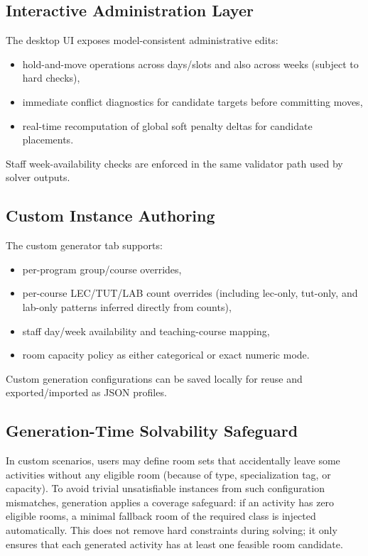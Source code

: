 \subsection{Interactive Administration Layer}
The desktop UI exposes model-consistent administrative edits:
\begin{itemize}[leftmargin=*]
  \item hold-and-move operations across days/slots and also across weeks (subject to hard checks),
  \item immediate conflict diagnostics for candidate targets before committing moves,
  \item real-time recomputation of global soft penalty deltas for candidate placements.
\end{itemize}
Staff week-availability checks are enforced in the same validator path used by solver outputs.

\subsection{Custom Instance Authoring}
The custom generator tab supports:
\begin{itemize}[leftmargin=*]
  \item per-program group/course overrides,
  \item per-course LEC/TUT/LAB count overrides (including lec-only, tut-only, and lab-only patterns inferred directly from counts),
  \item staff day/week availability and teaching-course mapping,
  \item room capacity policy as either categorical or exact numeric mode.
\end{itemize}
Custom generation configurations can be saved locally for reuse and exported/imported as JSON profiles.

\subsection{Generation-Time Solvability Safeguard}
In custom scenarios, users may define room sets that accidentally leave some activities without any eligible room
(because of type, specialization tag, or capacity).
To avoid trivial unsatisfiable instances from such configuration mismatches, generation applies a coverage safeguard:
if an activity has zero eligible rooms, a minimal fallback room of the required class is injected automatically.
This does not remove hard constraints during solving; it only ensures that each generated activity has at least one feasible room candidate.
